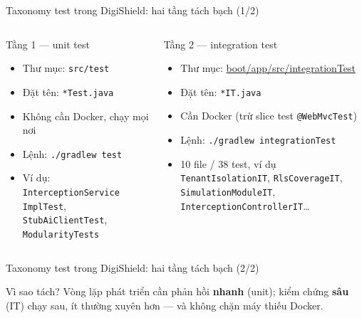 \documentclass[aspectratio=169,12pt]{beamer}
\begin{document}
\begin{frame}{Taxonomy test trong DigiShield: hai tầng tách bạch (1/2)}
  \begin{columns}[t]
    \begin{block}{Tầng 1 --- unit test}
      \begin{itemize}\small
        \item Thư mục: \texttt{src/test}
        \item Đặt tên: \texttt{*Test.java}
        \item Không cần Docker, chạy mọi nơi
        \item Lệnh: \texttt{./gradlew test}
        \item Ví dụ: \texttt{Interception\allowbreak Service\allowbreak
          Impl\allowbreak Test},
          \texttt{StubAiClientTest}, \texttt{ModularityTests}
      \end{itemize}
    \end{block}
    \begin{block}{Tầng 2 --- integration test}
      \begin{itemize}\footnotesize
        \item Thư mục: \url{boot/app/src/integrationTest}
        \item Đặt tên: \texttt{*IT.java}
        \item Cần Docker (trừ slice test \texttt{@WebMvcTest})
        \item Lệnh: \texttt{./gradlew integrationTest}
        \item 10 file / 38 test, ví dụ
          \texttt{TenantIsolationIT}, \texttt{RlsCoverageIT},
          \texttt{SimulationModuleIT},
          \texttt{InterceptionControllerIT}\ldots
      \end{itemize}
    \end{block}
  \end{columns}
\end{frame}

\begin{frame}{Taxonomy test trong DigiShield: hai tầng tách bạch (2/2)}
  \begin{alertblock}{Vì sao tách?}
    Vòng lặp phát triển cần phản hồi \textbf{nhanh} (unit); kiểm chứng
    \textbf{sâu} (IT) chạy sau, ít thường xuyên hơn --- và không chặn máy
    thiếu Docker.
  \end{alertblock}
\end{frame}
\end{document}
